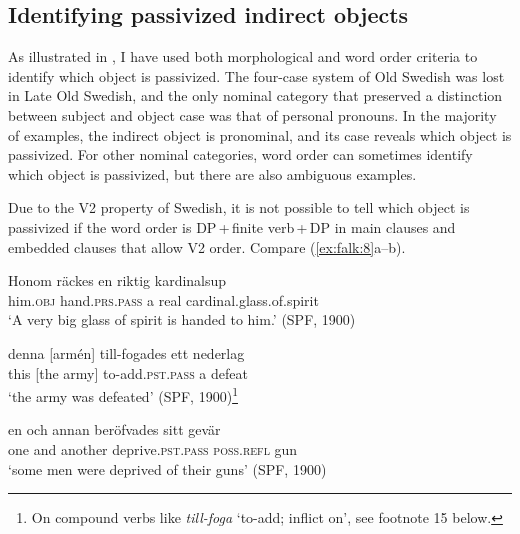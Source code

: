 \documentclass[output=paper]{langscibook}
\begin{document}
\subsection{Identifying passivized indirect objects}\label{sec:falk:3.2}


As illustrated in , I have used both morphological and word order criteria to identify which object is passivized. The four-case system of Old Swedish was lost in Late Old Swedish, and the only nominal category that preserved a distinction between subject and object case was that of personal pronouns. In the majority of examples, the indirect object is pronominal, and its case reveals which object is passivized. For other nominal categories, word order can sometimes identify which object is passivized, but there are also ambiguous examples.


Due to the V2 property of Swedish, it is not possible to tell which object is passivized if the word order is DP\,+\,finite verb\,+\,DP in main clauses and embedded clauses that allow V2 order. Compare (\ref{ex:falk:8}a–b).


\ea%
    \label{ex:falk:8}
\ea \label{ex:falk:8a}
\gll Honom  räckes        en    riktig  kardinalsup\\
      him.\textsc{obj}  hand\textsc{.prs}.\textsc{pass}  a      real   cardinal.glass.of.spirit\\
\glt ‘A very big glass of spirit is handed to him.’ (SPF, 1900)

\ex \label{ex:falk:8b}
\gll denna [armén]    till-fogades      ett  nederlag\\
      this {[the army]}    to-add.\textsc{pst}.\textsc{pass}  a   defeat\\
\glt       ‘the army was defeated’ (SPF, 1900)\footnote{On compound verbs like \textit{till-foga} ‘to-add; inflict on’, see footnote 15 below.}

\ex \label{ex:falk:8c}
\gll en    och  annan  beröfvades      sitt      gevär\\
      one  and  another  deprive\textsc{.pst}.\textsc{pass}  \textsc{poss.refl}  gun\\
\glt ‘some men were deprived of their guns’ (SPF, 1900)
\z
\z
\end{document}
